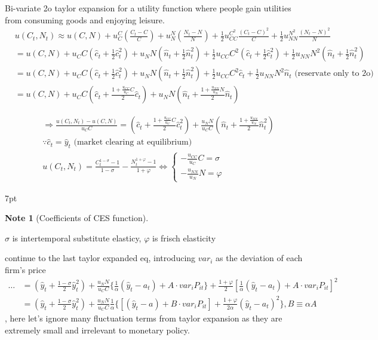 \documentclass{article}
\newenvironment{blueblock}{
\def\FrameCommand{
  \hspace{1pt}
    {\color{DarkBlue}
    \vrule width 2pt}
    {\color{blueshade}
    \vrule width 4pt}
  \colorbox{blueshade}
}
\MakeFramed{
  \advance
  \hsize-
  \width
  \FrameRestore}
\noindent\hspace{-4.55pt}%
\begin{adjustwidth}{}{7pt}
\vspace{2pt}\vspace{2pt}
}
{\vspace{2pt}\end{adjustwidth}\endMakeFramed}
\newtheorem{note}{Note}
\begin{document}
Bi-variate 2o taylor expansion for a utility function where people gain utilities from consuming goods and enjoying leisure.
\begin{align}
& u(C_t,N_t)\approx u(C,N)+u_C^C (\frac{C_t -C}{C})+u_N^N(\frac{N_t -N}{N})+\frac{1}{2}u_{CC}^{C^2}\frac{(C_t-C)^2}{C}+\frac{1}{2}u_{NN}^{N^2}\frac{(N_t-N)^2}{N}
\\& = u(C,N)+u_C C(\hat c_t +\frac{1}{2}\hat c_t^2)+u_N N(\hat n_t +\frac{1}{2} \hat n_t^2)+\frac{1}{2}u_{CC} C^2(\hat c_t +\frac{1}{2}\hat c_t^2)+\frac{1}{2}u_{NN} N^2(\hat n_t +\frac{1}{2}\hat n_t^2)
\\& = u(C,N)+u_C C(\hat c_t +\frac{1}{2}\hat c_t^2)+u_N N(\hat n_t +\frac{1}{2} \hat n_t^2)+\frac{1}{2}u_{CC} C^2 \hat c_t+\frac{1}{2}u_{NN} N^2 \hat n_t
\text{ (reservate only to 2o)}
\\& = u(C,N)+u_C C(\hat c_t + \frac{1+\frac{u_{CC}}{u_C}C}{2}\hat c_t)+u_N N(\hat n_t + \frac{1+\frac{u_{NN}}{u_N}N}{2}\hat n_t)
\end{align}

\begin{align}
& \Rightarrow \frac{u(C_t,N_t)-u(C,N)}{u_C C}
= (\hat c_t + \frac{1+\frac{u_{CC}}{u_C}C}{2}\hat c_t^2)+\frac{u_N N}{u_C C}(\hat n_t + \frac{1+\frac{u_{NN}}{u_N}}{2}\hat n^2_t)
\\& \because \hat c_t = \hat y_t \text{ (market clearing at equilibrium)}
\\&
u(C_t,N_t)=\frac{C_t^{1-\sigma}-1}{1-\sigma}-\frac{N_t^{1+\varphi}-1}{1+\varphi}
\iff 
\begin{cases}
-\frac{u_{CC}}{u_C}C=\sigma\\
-\frac{u_{NN}}{u_N}N=\varphi
\end{cases}
\end{align}

\begin{blueblock}
\begin{note}[Coefficients of CES function]
\end{note}
$\sigma$ is intertemporal substitute elasticy, $\varphi$ is frisch elasticity
\end{blueblock}

continue to the last taylor expanded eq, introducing $var_i$ as the deviation of each firm's price
\begin{align}
\dots &= (\hat y_t +\frac{1-\sigma}{2}\hat y_t^2)+\frac{u_N N}{u_C C}\{\frac{1}{\alpha}(\hat y_t -a_t)+A \cdot var_i P_{it}\}+\frac{1+\varphi}{2}[\frac{1}{\alpha}(\hat y_t - a_t)+A \cdot var_i P_{it}]^2
\\& = (\hat y_t +\frac{1-\sigma}{2}\hat y_t^2)+\frac{u_N N}{u_C C}\frac{1}{\alpha}\{[(\hat y_t -a)+B \cdot var_i P_{it}]+\frac{1+\varphi}{2 \alpha}(\hat y_t -a_t)^2\}, B\equiv \alpha A
\end{align}
, here let's ignore many fluctuation terms from taylor expansion as they are extremely small and irrelevant to monetary policy.
\end{document}
